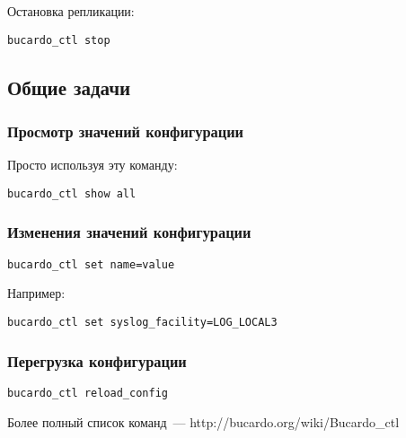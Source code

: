Остановка репликации:
\begin{lstlisting}[label=lst:bucardo12,caption=Остановка репликации]
bucardo_ctl stop
\end{lstlisting}

\subsection{Общие задачи}

\subsubsection{Просмотр значений конфигурации}
Просто используя эту команду:
\begin{lstlisting}[label=lst:bucardo13,caption=Просмотр значений конфигурации]
bucardo_ctl show all
\end{lstlisting}

\subsubsection{Изменения значений конфигурации}
\begin{lstlisting}[label=lst:bucardo14,caption=Изменения значений конфигурациии]
bucardo_ctl set name=value
\end{lstlisting}

Например:
\begin{lstlisting}[label=lst:bucardo15,caption=Изменения значений конфигурации]
bucardo_ctl set syslog_facility=LOG_LOCAL3
\end{lstlisting}

\subsubsection{Перегрузка конфигурации}
\begin{lstlisting}[label=lst:bucardo16,caption=Перегрузка конфигурации]
bucardo_ctl reload_config
\end{lstlisting}

Более полный список команд~--- http://bucardo.org/wiki/Bucardo\_ctl

